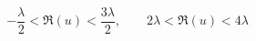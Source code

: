 \begin{equation}
-\frac{\lambda}{2}<\Re(u)<\frac{3\lambda}{2},\qquad 2\lambda<\Re(u)<4\lambda
\end{equation}

